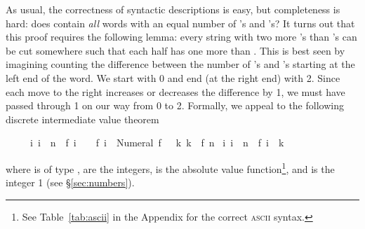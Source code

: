 \begin{isabellebody}
\begin{isamarkuptext}
As usual, the correctness of syntactic descriptions is easy, but completeness
is hard: does  contain \emph{all} words with an equal number of
's and 's? It turns out that this proof requires the
following lemma: every string with two more 's than 's can be cut somewhere such that each half has one more  than
. This is best seen by imagining counting the difference between the
number of 's and 's starting at the left end of the
word. We start with 0 and end (at the right end) with 2. Since each move to the
right increases or decreases the difference by 1, we must have passed through
1 on our way from 0 to 2. Formally, we appeal to the following discrete
intermediate value theorem 
\begin{isabelle}%
\ \ \ \ \ {\isasymlbrakk}{\isasymforall}i{\isachardot}\ i\ {\isacharless}\ n\ {\isasymlongrightarrow}\ {\isasymbar}f\ {\isacharparenleft}i\ {\isacharplus}\ {}{\isacharparenright}\ {\isacharminus}\ f\ i{\isasymbar}\ {\isasymle}\ Numeral{}{\isacharsemicolon}\ f\ {}\ {\isasymle}\ k{\isacharsemicolon}\ k\ {\isasymle}\ f\ n{\isasymrbrakk}\isanewline
\isaindent{\ \ \ \ \ }{\isasymLongrightarrow}\ {\isasymexists}i{\isachardot}\ i\ {\isasymle}\ n\ {\isasymand}\ f\ i\ {\isacharequal}\ k%
\end{isabelle}
where  is of type ,  are the integers,
\isa{{\isasymbar}{\isachardot}{\isasymbar}} is the absolute value function\footnote{See
Table~\ref{tab:ascii} in the Appendix for the correct \textsc{ascii}
syntax.}, and  is the integer 1 (see \S\ref{sec:numbers}).


\end{isamarkuptext}
\end{isabellebody}

